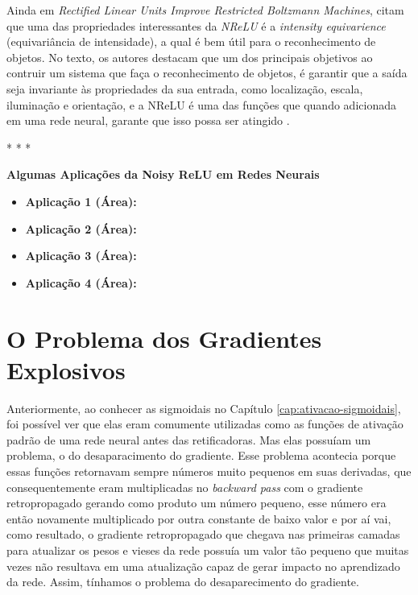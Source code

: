 Ainda em \textit{Rectified Linear Units Improve Restricted Boltzmann Machines}, \textcite{Nair2010} citam que uma das propriedades interessantes da \textit{NReLU} é a \textit{intensity equivarience} (equivariância de intensidade), a qual é bem útil para o reconhecimento de objetos. No texto, os autores destacam que um dos principais objetivos ao contruir um sistema que faça o reconhecimento de objetos, é garantir que a saída seja invariante às propriedades da sua entrada, como localização, escala, iluminação e orientação, e a NReLU é uma das funções que quando adicionada em uma rede neural, garante que isso possa ser atingido \parencite{Nair2010}.

\medskip
\begin{center}
 * * *
\end{center}
\medskip

\textbf{Algumas Aplicações da Noisy ReLU em Redes Neurais} 
\vspace{1em}

\begin{itemize}
    \item \textbf{Aplicação 1 (Área):}
    \item \textbf{Aplicação 2 (Área):}
    \item \textbf{Aplicação 3 (Área):}
    \item \textbf{Aplicação 4 (Área):}
\end{itemize}

\section{O Problema dos Gradientes Explosivos} 

Anteriormente, ao conhecer as sigmoidais no Capítulo \ref{cap:ativacao-sigmoidais}, foi possível ver que elas eram comumente utilizadas como as funções de ativação padrão de uma rede neural antes das retificadoras. Mas elas possuíam um problema, o do desaparacimento do gradiente. Esse problema acontecia porque essas funções retornavam sempre números muito pequenos em suas derivadas, que consequentemente eram multiplicadas no \textit{backward pass} com o gradiente retropropagado gerando como produto um número pequeno, esse número era então novamente multiplicado por outra constante de baixo valor e por aí vai, como resultado, o gradiente retropropagado que chegava nas primeiras camadas para atualizar os pesos e vieses da rede possuía um valor tão pequeno que muitas vezes não resultava em uma atualização capaz de gerar impacto no aprendizado da rede. Assim, tínhamos o problema do desaparecimento do gradiente.

